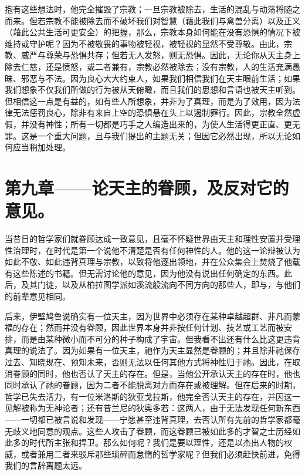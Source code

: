 抱有这些想法时，他完全摧毁了宗教；一旦宗教被除去，生活的混乱与动荡将随之而来。但若宗教不能被除去而不破坏我们对智慧（藉此我们与禽兽分离）以及正义（藉此公共生活可更安全）的把握，那么，宗教本身如何能在没有恐惧的情况下被维持或守护呢？因为不被敬畏的事物被轻视，被轻视的显然不受尊敬。由此，宗教、威严与尊荣与恐惧共存；但若无人发怒，则无恐惧。因此，无论你从天主身上除去仁慈，还是愤怒，或二者兼有，宗教必然被除去；没有宗教，人的生活充满愚昧、邪恶与不法。因为良心大大约束人，如果我们相信我们在天主眼前生活；如果我们想象不仅我们所做的行为被从天俯瞰，而且我们的思想和言语也被天主听到。但相信这一点是有益的，如有些人所想象，并非为了真理，而是为了效用，因为法律无法惩罚良心，除非有来自上空的恐惧悬在头上以遏制罪行。因此，宗教全然虚假，并没有神性；所有一切都是巧手之人编造出来的，为使人生活得更正直、更无罪。这是一个重大问题，且与我们提出的主题无关；但因它必然出现，所以无论如何应当稍加处理。\par


\section{第九章——论天主的眷顾，及反对它的意见。}

当昔日的哲学家们就眷顾达成一致意见，且毫不怀疑世界由天主和理性安置并受理性治理时，在时代是第一个说他不清楚是否有任何神性的人。他的这一论辩被认为如此不敬、如此违背真理与宗教，以致将他逐出领地，并在公众集会上焚烧了他载有这些陈述的书籍。但无需讨论他的意见，因为他没有说出任何确定的东西。此后，及其门徒，以及从柏拉图学派如溪流般流向不同方向的那些人，即与，与他们的前辈意见相同。\par

后来，伊壁鸠鲁说确实有一位天主，因为世界中必须存在某种卓越超群、非凡而蒙福的存在；然而并没有眷顾，因此世界本身并非按任何计划、技艺或工艺而被安排，而是由某种微小而不可分的种子构成了宇宙。但我看不出还有什么比这更违背真理的说法了。因为如果有一位天主，祂作为天主显然是眷顾的；并且除非祂保存过去、知晓现在、预知未来，否则无法以任何其他方式将神性归于祂。因此，在取消眷顾的同时，他也否认了天主的存在。但是，当他公开承认天主的存在时，他也同时承认了祂的眷顾，因为二者不能脱离对方而存在或被理解。但在后来的时期，哲学已失去活力，有一位米洛斯的狄亚戈拉斯，他完全否认天主的存在，并因这一见解被称为无神论者；还有昔兰尼的狄奥多若：这两人，由于无法发现任何新东西——一切都已被言说和发现——宁愿甚至违背真理，去否认所有先前的哲学家都毫无歧义地同意的观点。这些人攻击了眷顾，而这眷顾已被如此多的才智之士历经如此多的时代所主张和捍卫。那么如何呢？我们是要以理性，还是以杰出人物的权威，或者兼用二者来驳斥那些琐碎而怠惰的哲学家呢？但我们必须赶快前进，免得我们的言辞离题太远。\par

